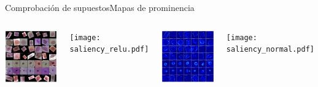 \documentclass{beamer}
\begin{document}
    \begin{frame}{Comprobación de supuestos}{Mapas de prominencia}
    \begin{columns}
        \includegraphics[width=\columnwidth,height=0.95\columnwidth]{muestras_saliency.pdf}

        \texttt{[image: saliency\_relu.pdf]}

        \includegraphics[width=\columnwidth,height=0.95\columnwidth]{saliency_guided.pdf}

        \texttt{[image: saliency\_normal.pdf]}

    \end{columns}
    \end{frame}
\end{document}
